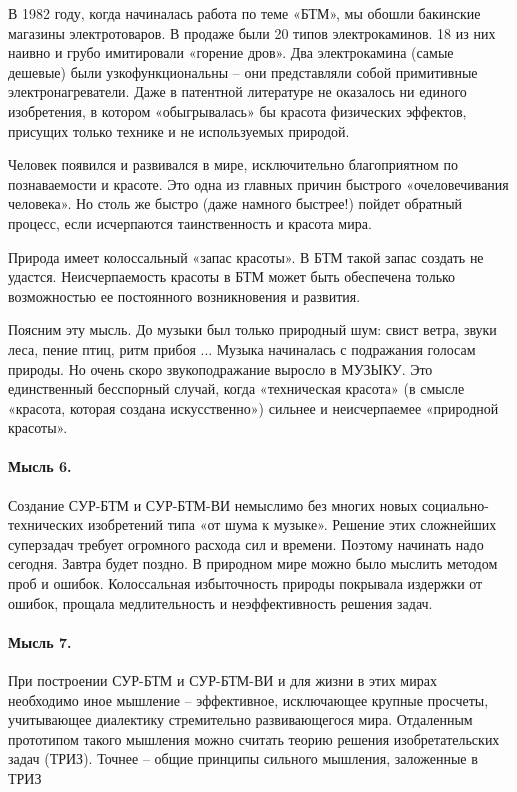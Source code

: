 \documentclass[11pt,a4paper]{article}
\begin{document}
В 1982 году, когда начиналась работа по теме «БТМ», мы обошли бакинские
магазины электротоваров. В продаже были 20 типов электрокаминов. 18 из них
наивно и грубо имитировали «горение дров». Два электрокамина (самые дешевые)
были узкофункциональны -- они представляли собой примитивные
электронагреватели. Даже в патентной литературе не оказалось ни единого
изобретения, в котором «обыгрывалась» бы красота физических эффектов, присущих
только технике и не используемых природой.

Человек появился и развивался в мире, исключительно благоприятном по
познаваемости и красоте. Это одна из главных причин быстрого «очеловечивания
человека». Но столь же быстро (даже намного быстрее!) пойдет обратный процесс,
если исчерпаются таинственность и красота мира.

Природа имеет колоссальный «запас красоты». В БТМ такой запас создать не
удастся. Неисчерпаемость красоты в БТМ может быть обеспечена только
возможностью ее постоянного возникновения и развития.

Поясним эту мысль. До музыки был только природный шум: свист ветра, звуки
леса, пение птиц, ритм прибоя ... Музыка начиналась с подражания голосам
природы. Но очень скоро звукоподражание выросло в МУЗЫКУ. Это единственный
бесспорный случай, когда «техническая красота» (в смысле «красота, которая
создана искусственно») сильнее и неисчерпаемее «природной красоты».

\paragraph{Мысль 6.}
Создание СУР-БТМ и СУР-БТМ-ВИ немыслимо без многих новых социально-технических
изобретений типа «от шума к музыке». Решение этих сложнейших суперзадач
требует огромного расхода сил и времени. Поэтому начинать надо сегодня. Завтра
будет поздно. В природном мире можно было мыслить методом проб и ошибок.
Колоссальная избыточность природы покрывала издержки от ошибок, прощала
медлительность и неэффективность решения задач.

\paragraph{Мысль 7.}
При построении СУР-БТМ и СУР-БТМ-ВИ и для жизни в этих мирах необходимо иное
мышление -- эффективное, исключающее крупные просчеты, учитывающее диалектику
стремительно развивающегося мира. Отдаленным прототипом такого мышления можно
считать теорию решения изобретательских задач (ТРИЗ). Точнее -- общие принципы
сильного мышления, заложенные в ТРИЗ
\end{document}
